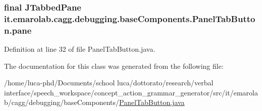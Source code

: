 \hypertarget{classit_1_1emarolab_1_1cagg_1_1debugging_1_1baseComponents_1_1PanelTabButton_a101965a46434888ec10c4dabba55faa1}{
\subsubsection[{pane}]{\setlength{\rightskip}{0pt plus 5cm}final J\-Tabbed\-Pane it.\-emarolab.\-cagg.\-debugging.\-base\-Components.\-Panel\-Tab\-Button.\-pane\hspace{0.3cm}{\ttfamily [private]}}}\label{classit_1_1emarolab_1_1cagg_1_1debugging_1_1baseComponents_1_1PanelTabButton_a101965a46434888ec10c4dabba55faa1}


Definition at line 32 of file Panel\-Tab\-Button.\-java.



The documentation for this class was generated from the following file\-:\begin{DoxyCompactItemize}
\item 
/home/luca-\/phd/\-Documents/school luca/dottorato/research/verbal interface/speech\-\_\-workspace/concept\-\_\-action\-\_\-grammar\-\_\-generator/src/it/emarolab/cagg/debugging/base\-Components/\hyperlink{PanelTabButton_8java}{Panel\-Tab\-Button.\-java}\end{DoxyCompactItemize}
